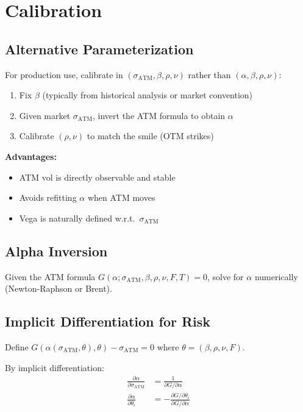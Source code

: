 \documentclass[12pt,a4paper]{report}
\begin{document}
\section{Calibration}

\subsection{Alternative Parameterization}

For production use, calibrate in $(\sigma_{\text{ATM}}, \beta, \rho, \nu)$ rather than $(\alpha, \beta, \rho, \nu)$:

\begin{enumerate}[leftmargin=1.2em,itemsep=0.1em]
    \item Fix $\beta$ (typically from historical analysis or market convention)
    \item Given market $\sigma_{\text{ATM}}$, invert the ATM formula to obtain $\alpha$
    \item Calibrate $(\rho, \nu)$ to match the smile (OTM strikes)
\end{enumerate}

\textbf{Advantages:}
\begin{itemize}[leftmargin=1.2em,itemsep=0.1em]
    \item ATM vol is directly observable and stable
    \item Avoids refitting $\alpha$ when ATM moves
    \item Vega is naturally defined w.r.t.\ $\sigma_{\text{ATM}}$
\end{itemize}

\subsection{Alpha Inversion}

Given the ATM formula $G(\alpha; \sigma_{\text{ATM}}, \beta, \rho, \nu, F, T) = 0$, solve for $\alpha$ numerically (Newton-Raphson or Brent).

\subsection{Implicit Differentiation for Risk}

Define $G(\alpha(\sigma_{\text{ATM}}, \theta), \theta) - \sigma_{\text{ATM}} = 0$ where $\theta = (\beta, \rho, \nu, F)$.

By implicit differentiation:
\begin{align}
    \frac{\partial \alpha}{\partial \sigma_{\text{ATM}}} &= \frac{1}{\partial G / \partial \alpha} \\
    \frac{\partial \alpha}{\partial \theta_i} &= -\frac{\partial G / \partial \theta_i}{\partial G / \partial \alpha}
\end{align}
\end{document}
